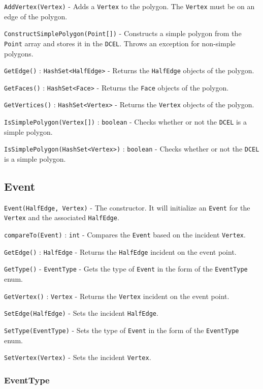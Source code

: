 \documentclass[11pt]{article}
\begin{document}
	\texttt{AddVertex(Vertex)} - Adds a \texttt{Vertex} to the polygon. The \texttt{Vertex} must be on an edge of the polygon.
	
	\texttt{ConstructSimplePolygon(Point[])} - Constructs a simple polygon from the \texttt{Point} array and stores it in the \texttt{DCEL}. Throws an exception for non-simple polygons.
	
	\texttt{GetEdge()} : \texttt{HashSet<HalfEdge>} - Returns the \texttt{HalfEdge} objects of the polygon.
	
	\texttt{GetFaces()} : \texttt{HashSet<Face>} - Returns the \texttt{Face} objects of the polygon.
	
	\texttt{GetVertices()} : \texttt{HashSet<Vertex>} - Returns the \texttt{Vertex} objects of the polygon.
	
	\texttt{IsSimplePolygon(Vertex[])} : \texttt{boolean} - Checks whether or not the \texttt{DCEL} is a simple polygon.
	
	\texttt{IsSimplePolygon(HashSet<Vertex>)} : \texttt{boolean} - Checks whether or not the \texttt{DCEL} is a simple polygon.

\subsection{Event}
\label{sec:event}

	\texttt{Event(HalfEdge, Vertex)} - The constructor. It will initialize an \texttt{Event} for the \texttt{Vertex} and the associated \texttt{HalfEdge}.
	
	\texttt{compareTo(Event)} : \texttt{int} - Compares the \texttt{Event} based on the incident \texttt{Vertex}.
	
	\texttt{GetEdge()} : \texttt{HalfEdge} - Returns the \texttt{HalfEdge} incident on the event point.
	
	\texttt{GetType()} - \texttt{EventType} - Gets the type of \texttt{Event} in the form of the \texttt{EventType} enum.
	
	\texttt{GetVertex()} : \texttt{Vertex} - Returns the \texttt{Vertex} incident on the event point.
	
	\texttt{SetEdge(HalfEdge)} - Sets the incident \texttt{HalfEdge}.
	
	\texttt{SetType(EventType)} - Sets the type of \texttt{Event} in the form of the \texttt{EventType} enum.
	
	\texttt{SetVertex(Vertex)} - Sets the incident \texttt{Vertex}.
	
\subsubsection{EventType}
\label{sec:eventtype}
\end{document}
